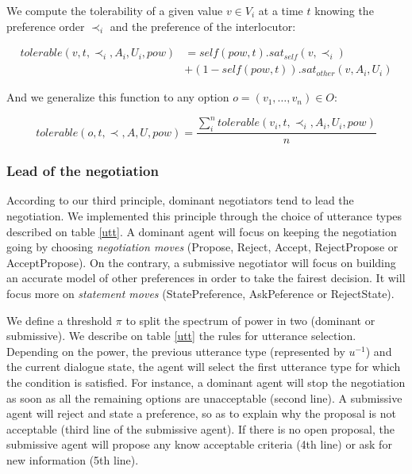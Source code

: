 \documentclass{llncs}
\begin{document}
	We compute the tolerability of a given value $v\in V_i$ at a time $t$ knowing the preference order $\prec_i$ and the preference of the interlocutor:
	
	\begin{equation}
	\begin{split}
	tolerable(v, t, \prec_i, A_i, U_i, pow) & = self(pow, t) . sat_{self}(v, \prec_i) \\
	& +  (1 - self(pow, t)) . sat_{other}(v, A_i, U_i)
	\end{split} 
	\end{equation}
	
	And we generalize this function to any option $o=(v_1,\ldots,v_n) \in O$:
	
	\begin{equation}
	tolerable(o, t, \prec, A, U, pow) = \frac{ \sum_{i}^{n} tolerable(v_i, t, \prec_i, A_i, U_i, pow) } {n}
	\end{equation}
	
	
	\subsubsection{Lead of the negotiation}
	According to our third principle, dominant negotiators tend to lead the negotiation. We implemented this principle through the choice of utterance types described on table \ref{utt}. A dominant agent will focus on keeping the negotiation going by choosing \emph{negotiation moves} (Propose, Reject, Accept, RejectPropose or AcceptPropose). On the contrary, a submissive negotiator will focus on building an accurate model of other preferences in order to take the fairest decision. It will focus more on \emph{statement moves} (StatePreference, AskPeference or RejectState).
	
	We define a threshold $\pi$ to split the spectrum of power in two (dominant or submissive). We describe on table \ref{utt} the rules for utterance selection. Depending on the power, the previous utterance type (represented by $u^{-1}$) and the current dialogue state, the agent will select the first utterance type for which the condition is satisfied. For instance, a dominant agent will stop the negotiation as soon as all the remaining options are unacceptable (second line). A submissive agent will reject and state a preference, so as to explain why the proposal is not acceptable (third line of the submissive agent). If there is no open proposal, the submissive agent will propose any know acceptable criteria (4th line) or ask for new information (5th line).
	
\end{document}
